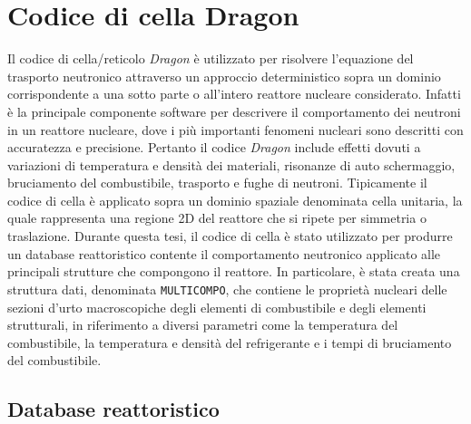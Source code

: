 \section{Codice di cella Dragon}
Il codice di cella/reticolo \textit{Dragon} è utilizzato per risolvere 
l'equazione del 
trasporto neutronico attraverso un approccio deterministico sopra un dominio 
corrispondente a una sotto parte o all'intero reattore nucleare considerato.
Infatti è la principale componente software per descrivere il comportamento dei 
neutroni in un reattore nucleare, dove i più importanti fenomeni nucleari sono 
descritti con accuratezza e precisione.
Pertanto il codice \textit{Dragon} include effetti dovuti a variazioni di 
temperatura e densità dei 
materiali, risonanze di auto schermaggio, bruciamento del combustibile, 
trasporto 
e fughe di neutroni. 
Tipicamente il codice di cella è applicato sopra un dominio spaziale denominata 
cella unitaria, la quale rappresenta una regione 2D del reattore che si ripete 
per simmetria o traslazione.
Durante questa tesi, il codice di cella è stato utilizzato per produrre un 
database reattoristico contente il comportamento neutronico applicato alle 
principali strutture che compongono il reattore.
In particolare, è stata creata una struttura dati, denominata 
\texttt{MULTICOMPO}, che 
contiene le proprietà nucleari delle sezioni d'urto macroscopiche degli 
elementi 
di combustibile e degli elementi strutturali, in riferimento a diversi 
parametri 
come la temperatura del combustibile, la temperatura e densità del refrigerante 
e i tempi di bruciamento del combustibile. 

\subsection{Database reattoristico \label{datareactor}}

